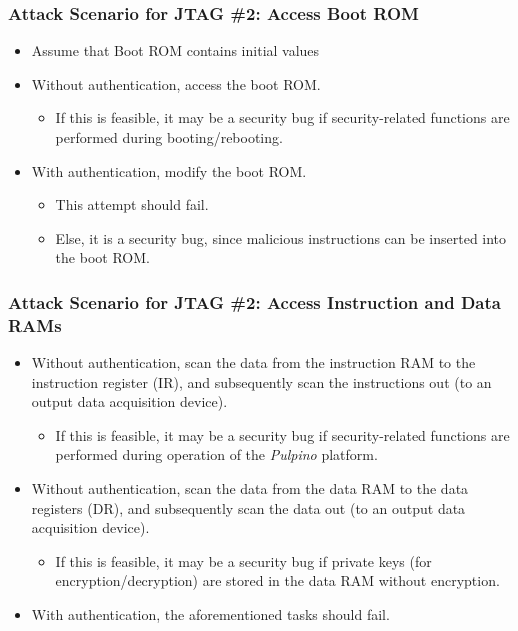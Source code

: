 \documentclass[xcolor={usenames,dvipsnames},hyperref={hyperindex,bookmarks}]{beamer}
\begin{document}
\frame
{
	\frametitle{Attack Scenario for JTAG \#2: Access Boot ROM}

	\begin{itemize}
	\item Assume that Boot ROM contains initial values
	\item Without authentication, access the boot ROM.
		\begin{itemize}
		\item If this is feasible, it may be a security bug if security-related functions are performed during booting/rebooting.
		\end{itemize}
	\item With authentication, modify the boot ROM.
		\begin{itemize}
		\item This attempt should fail.
		\item Else, it is a security bug, since malicious instructions can be inserted into the boot ROM.
		\end{itemize}
	\end{itemize}
}








\frame
{
	\frametitle{Attack Scenario for JTAG \#2: Access Instruction and Data RAMs}

	\begin{itemize}
	\item Without authentication, scan the data from the instruction RAM to the instruction register (IR), and subsequently scan the instructions out (to an output data acquisition device).
		\begin{itemize}
		\item If this is feasible, it may be a security bug if security-related functions are performed during operation of the {\it Pulpino} platform.
		\end{itemize}
	\item Without authentication, scan the data from the data RAM to the data registers (DR), and subsequently scan the data out (to an output data acquisition device).
		\begin{itemize}
		\item If this is feasible, it may be a security bug if private keys (for encryption/decryption) are stored in the data RAM without encryption.
		\end{itemize}
	\item With authentication, the aforementioned tasks should fail.
	\end{itemize}
}
\end{document}
